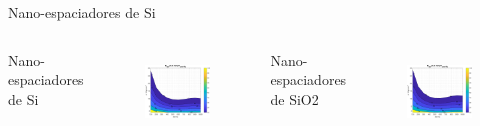\documentclass[spanish,a4paper]{beamer}%
\begin{document}
\begin{frame}{Nano-espaciadores de Si}
{			\begin{columns}
						\begin{block}{\centering Nano-espaciadores de Si }
						\end{block}
					\vspace{15pt}
						\begin{figure}[h]%
								\centering
										\includegraphics[width=\columnwidth]{rel_SiC}
								\label{fig:rel_SiC}%
						\end{figure}
						\vfill
					\vspace{-14pt}
						\begin{block}{\centering Nano-espaciadores de SiO2}
							\end{block}
					\vspace{16pt}\vfill
						\begin{figure}[h]%
								\centering
										\includegraphics[width=\columnwidth]{SiC_Rc}%
								\label{fig:SiC_Rc}%
						\end{figure}
						\vfill
				\end{columns}	
				\vfill
		}
	\end{frame}
\end{document}
